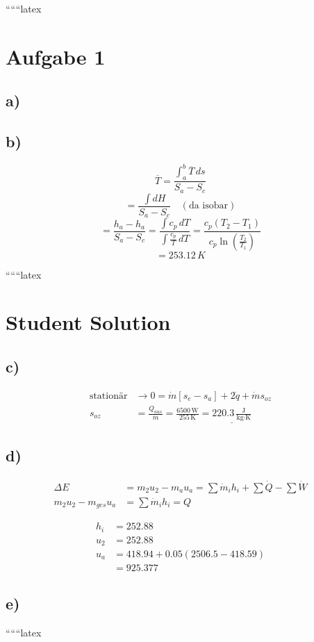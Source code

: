 
``````latex

\section*{Aufgabe 1}

\subsection*{a)}

\subsection*{b)}
\[
\overline{T} = \frac{\int_{a}^{b} \overline{T} \, ds}{S_a - S_c}
\]
\[
= \frac{\int dH}{S_a - S_c} \quad \left( \text{da isobar} \right)
\]
\[
= \frac{h_a - h_a}{S_a - S_c} = \frac{\int c_p \, dT}{\int \frac{c_p}{T} \, dT} = \frac{c_p (T_2 - T_1)}{c_p \ln \left( \frac{T_2}{T_1} \right)}
\]
\[
= 253.12 \, K
\]

``````latex


\section*{Student Solution}

\subsection*{c)}

\begin{align*}
\text{stationär} &\rightarrow 0 = \dot{m} [s_{e} - s_{a}] + 2 \dot{q} + \dot{m} s_{oz} \\
s_{oz} &= \frac{Q_{aus}}{\dot{m}} = \frac{6500 \, \text{W}}{255 \, \text{K}} = \underline{220.3 \, \frac{\text{J}}{\text{kg} \cdot \text{K}}}
\end{align*}

\subsection*{d)}

\begin{align*}
\Delta E &= m_{2} u_{2} - m_{a} u_{a} = \sum \dot{m}_{i} h_{i} + \sum \dot{Q} - \sum \dot{W} \\
m_{2} u_{2} - m_{ges} u_{a} &= \sum \dot{m}_{i} h_{i} = Q
\end{align*}

\begin{align*}
h_{i} &= 252.88 \\
u_{2} &= 252.88 \\
u_{a} &= 418.94 + 0.05 (2506.5 - 418.59) \\
&= 925.377
\end{align*}

\subsection*{e)}

``````latex


